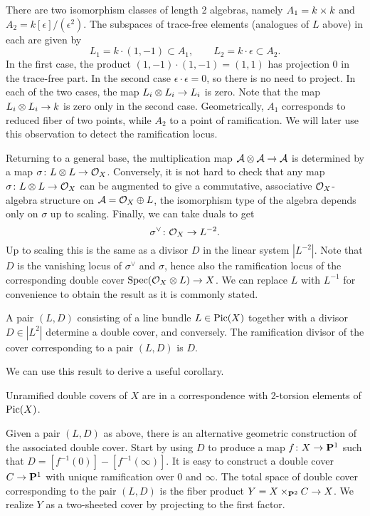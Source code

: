 There are two isomorphism classes of length 2 algebras, namely $A_1 = k \times k$ and $A_2 = k[\epsilon]/(\epsilon^2)$. The subspaces of trace-free elements (analogues of $L$ above) in each are given by
\[
L_1 = k \cdot (1,-1) \subset A_1, \qquad
L_2 = k \cdot \epsilon \subset A_2.
\]
In the first case, the product $(1,-1) \cdot (1,-1) = (1,1)$ has projection $0$ in the trace-free part. In the second case $\epsilon \cdot \epsilon = 0$, so there is no need to project. In each of the two cases, the map $L_i \otimes L_i \rarr L_i$ is zero. Note that the map $L_i \otimes L_i \rarr k$ is zero only in the second case. Geometrically, $A_1$ corresponds to reduced fiber of two points, while $A_2$ to a point of ramification. We will later use this observation to detect the ramification locus.

Returning to a general base, the multiplication map $\Ac \otimes \Ac \rarr \Ac$ is determined by a map $\sigma \cn L \otimes L \rarr \Oc_X$. Conversely, it is not hard to check that any map $\sigma \cn L \otimes L \rarr \Oc_X$ can be augmented to give a commutative, associative $\mathcal{O}_X$-algebra structure on $\mathcal{A} = \mathcal{O}_X \oplus L$, the isomorphism type of the algebra depends only on $\sigma$ up to scaling. Finally, we can take duals to get
\[
\sigma^\vee \cn \Oc_X \rarr L^{-2}.
\]
Up to scaling this is the same as a divisor $D$ in the linear system $|L^{-2}|$. Note that $D$ is the vanishing locus of $\sigma^\vee$ and $\sigma$, hence also the ramification locus of the corresponding double cover $\Spec(\Oc_X \otimes L) \rarr X$. We can replace $L$ with $L^{-1}$ for convenience to obtain the result as it is commonly stated.

\begin{proposition}
  A pair $(L,D)$ consisting of a line bundle $L \in \operatorname{Pic}(X)$ together with a divisor $D \in |L^2|$ determine a double cover, and conversely. The ramification divisor of the cover corresponding to a pair $(L,D)$ is $D$.
\end{proposition}

We can use this result to derive a useful corollary.

\begin{corollary}
  Unramified double covers of $X$ are in a correspondence with 2-torsion elements of $\operatorname{Pic}(X)$.
\end{corollary}

Given a pair $(L,D)$ as above, there is an alternative geometric construction of the associated double cover. Start by using $D$ to produce a map $f \cn X \rarr \Pbb^1$ such that $D = [f^{-1}(0)] - [f^{-1}(\infty)]$. It is easy to construct a double cover $C \rarr \Pbb^1$ with unique ramification over $0$ and $\infty$. The total space of double cover corresponding to the pair $(L, D)$ is the fiber product $Y = X \x_{\Pbb^2} C \rarr X$. We realize $Y$ as a two-sheeted cover by projecting to the first factor.

